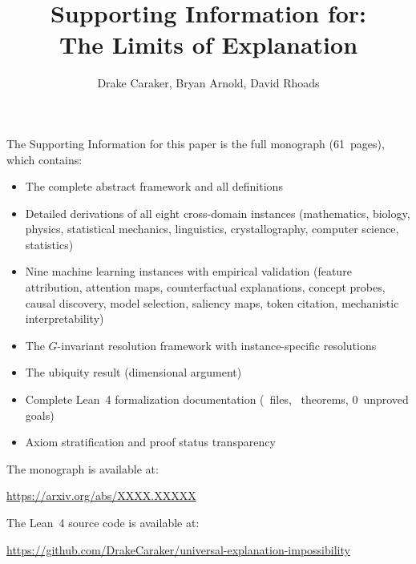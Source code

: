 \documentclass[11pt]{article}
\title{\Large\textbf{Supporting Information for:\\[4pt]
  The Limits of Explanation}}
\author{%
  Drake Caraker, Bryan Arnold, David Rhoads
}
\date{}
\begin{document}
\maketitle
\thispagestyle{empty}

\vspace{2cm}

\noindent
The Supporting Information for this paper is the full monograph (61~pages),
which contains:

\begin{itemize}
  \item The complete abstract framework and all definitions
  \item Detailed derivations of all eight cross-domain instances
    (mathematics, biology, physics, statistical mechanics, linguistics,
    crystallography, computer science, statistics)
  \item Nine machine learning instances with empirical validation
    (feature attribution, attention maps, counterfactual explanations,
    concept probes, causal discovery, model selection, saliency maps,
    token citation, mechanistic interpretability)
  \item The $G$-invariant resolution framework with instance-specific resolutions
  \item The ubiquity result (dimensional argument)
  \item Complete Lean~4 formalization documentation
    (\ClaimMainFiles~files, \ClaimMainTheorems~theorems, 0~unproved goals)
  \item Axiom stratification and proof status transparency
\end{itemize}

\vspace{1cm}

\noindent
The monograph is available at:

\begin{center}
  \url{https://arxiv.org/abs/XXXX.XXXXX}
\end{center}

\vspace{0.5cm}

\noindent
The Lean~4 source code is available at:

\begin{center}
  \url{https://github.com/DrakeCaraker/universal-explanation-impossibility}
\end{center}
\end{document}
